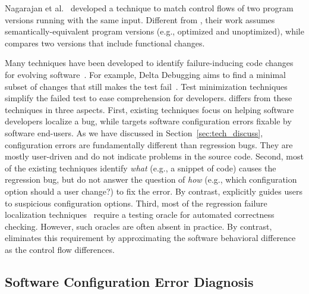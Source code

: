 Nagarajan et al.~\cite{4362621} developed a technique to match
control flows of two program versions running with
the same input. Different from \ourtool, their
work assumes semantically-equivalent program versions (e.g., optimized
and unoptimized), while \ourtool compares two versions
that include functional changes. 

Many techniques have been developed to identify
failure-inducing code changes for evolving
software~\cite{Banerjee:2010:GID, r2fix, Qi:2009:DAD, Hoffman:2009:STA}.
For example, Delta Debugging aims to find a minimal
subset of changes that still makes the test fail~\cite{dd}.
Test minimization techniques~\cite{Hoffman:2009:STA, Zhang:2013:PST}
simplify the failed
test to ease comprehension for developers. 
\ourtool differs from these techniques in three aspects.
First, existing techniques focus on helping software developers
localize a bug, while \ourtool targets software
configuration errors fixable by software end-users.
As we have discussed in Section~\ref{sec:tech_discuss},
configuration errors are fundamentally different than regression bugs.
They are mostly user-driven and do not indicate problems in the source
code. Second, most of the existing techniques identify
\textit{what} (e.g., a snippet of code) causes the
regression bug, but do not answer
the question of \textit{how} (e.g., which
configuration option should a user change?) to
fix the error. By contrast, \ourtool
explicitly guides users to suspicious configuration options.
Third, most of the regression failure localization
techniques~\cite{dd} require 
a testing oracle for automated correctness checking. However,
such oracles are often absent in practice.
By contrast, \ourtool eliminates this requirement by
approximating the software behavioral difference as the control
flow differences.


\subsection{Software Configuration Error Diagnosis}

